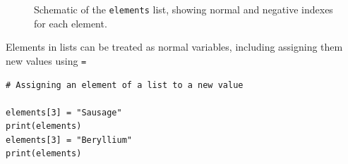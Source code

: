\documentclass[a4paper]{article}
\begin{document}
\begin{figure}[tb]
  \centering
    \caption{\label{fig:list_indexing}Schematic of the \texttt{elements} list, showing normal and negative indexes for each element.}
\end{figure}
Elements in lists can be treated as normal variables, including assigning them new values using \texttt{=}
\begin{lstlisting}
# Assigning an element of a list to a new value

elements[3] = "Sausage"
print(elements)
elements[3] = "Beryllium"
print(elements)
\end{lstlisting}
\end{document}

